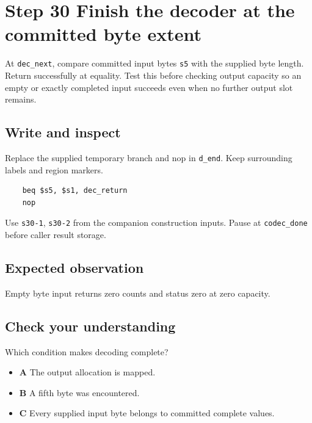 \section{Step 30 Finish the decoder at the committed byte extent}\label{delta-s30}

At \texttt{dec\_next}, compare committed input bytes \texttt{s5} with the supplied byte length. Return successfully at equality. Test this before checking output capacity so an empty or exactly completed input succeeds even when no further output slot remains.

\subsection{Write and inspect}
Replace the supplied temporary branch and nop in \texttt{d\_end}. Keep surrounding labels and region markers.

\begin{verbatim}
    beq $s5, $s1, dec_return
    nop
\end{verbatim}
Use \texttt{s30-1}, \texttt{s30-2} from the companion construction inputs. Pause at \texttt{codec\_done} before caller result storage.

\subsection{Expected observation}
Empty byte input returns zero counts and status zero at zero capacity.

\subsection{Check your understanding}
Which condition makes decoding complete?

\begin{itemize}
  \item \textbf{A} The output allocation is mapped.
  \item \textbf{B} A fifth byte was encountered.
  \item \textbf{C} Every supplied input byte belongs to committed complete values.
\end{itemize}
